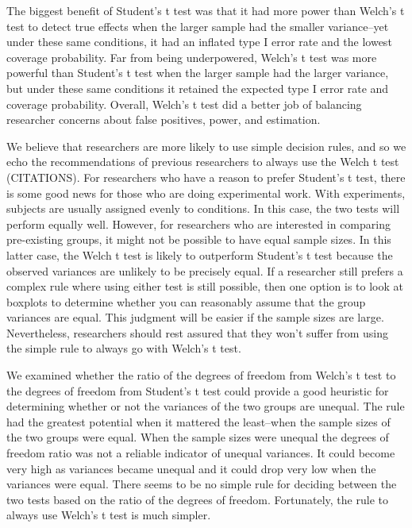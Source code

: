 \documentclass[man,a4paper,noextraspace,apacite]{apa6}\usepackage[]{graphicx}\usepackage[]{color}
\begin{document}
    The biggest benefit of Student's t test was that it had more power than Welch's t test to detect true effects when the larger sample had the smaller variance--yet under these same conditions, it had an inflated type I error rate and the lowest coverage probability. Far from being underpowered, Welch's t test was more powerful than Student's t test when the larger sample had the larger variance, but under these same conditions it retained the expected type I error rate and coverage probability. Overall, Welch's t test did a better job of balancing researcher concerns about false positives, power, and estimation.
    
    We believe that researchers are more likely to use simple decision rules, and so we echo the recommendations of previous researchers to always use the Welch t test (CITATIONS). For researchers who have a reason to prefer Student's t test, there is some good news for those who are doing experimental work. With experiments, subjects are usually assigned evenly to conditions. In this case, the two tests will perform equally well. However, for researchers who are interested in comparing pre-existing groups, it might not be possible to have equal sample sizes. In this latter case, the Welch t test is likely to outperform Student's t test because the observed variances are unlikely to be precisely equal. If a researcher still prefers a complex rule where using either test is still possible, then one option is to look at boxplots to determine whether you can reasonably assume that the group variances are equal. This judgment will be easier if the sample sizes are large. Nevertheless, researchers should rest assured that they won't suffer from using the simple rule to always go with Welch's t test.
    
    We examined whether the ratio of the degrees of freedom from Welch's t test to the degrees of freedom from Student's t test could provide a good heuristic for determining whether or not the variances of the two groups are unequal. The rule had the greatest potential when it mattered the least--when the sample sizes of the two groups were equal. When the sample sizes were unequal the degrees of freedom ratio was not a reliable indicator of unequal variances. It could become very high as variances became unequal and it could drop very low when the variances were equal. There seems to be no simple rule for deciding between the two tests based on the ratio of the degrees of freedom. Fortunately, the rule to always use Welch's t test is much simpler.
    
\end{document}

